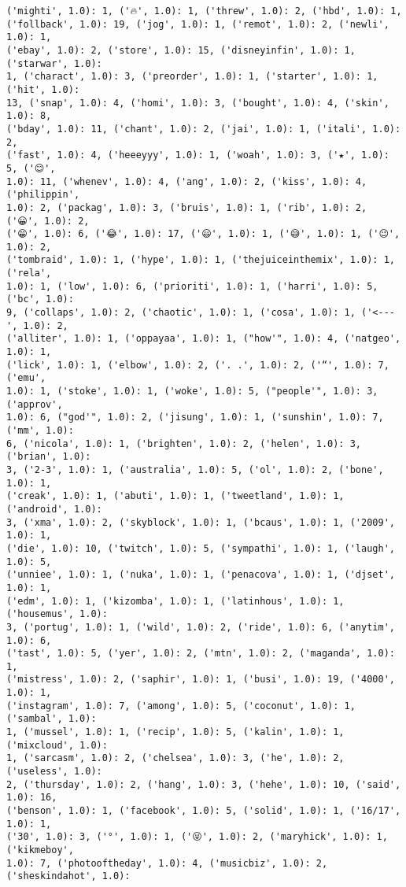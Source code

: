 \documentclass[11pt]{article}
\begin{document}
\begin{Verbatim}[commandchars=\\\{\}]
('mighti', 1.0): 1, ('🔥', 1.0): 1, ('threw', 1.0): 2, ('hbd', 1.0): 1,
('follback', 1.0): 19, ('jog', 1.0): 1, ('remot', 1.0): 2, ('newli', 1.0): 1,
('ebay', 1.0): 2, ('store', 1.0): 15, ('disneyinfin', 1.0): 1, ('starwar', 1.0):
1, ('charact', 1.0): 3, ('preorder', 1.0): 1, ('starter', 1.0): 1, ('hit', 1.0):
13, ('snap', 1.0): 4, ('homi', 1.0): 3, ('bought', 1.0): 4, ('skin', 1.0): 8,
('bday', 1.0): 11, ('chant', 1.0): 2, ('jai', 1.0): 1, ('itali', 1.0): 2,
('fast', 1.0): 4, ('heeeyyy', 1.0): 1, ('woah', 1.0): 3, ('★', 1.0): 5, ('😊',
1.0): 11, ('whenev', 1.0): 4, ('ang', 1.0): 2, ('kiss', 1.0): 4, ('philippin',
1.0): 2, ('packag', 1.0): 3, ('bruis', 1.0): 1, ('rib', 1.0): 2, ('😀', 1.0): 2,
('😁', 1.0): 6, ('😂', 1.0): 17, ('😃', 1.0): 1, ('😅', 1.0): 1, ('😉', 1.0): 2,
('tombraid', 1.0): 1, ('hype', 1.0): 1, ('thejuiceinthemix', 1.0): 1, ('rela',
1.0): 1, ('low', 1.0): 6, ('prioriti', 1.0): 1, ('harri', 1.0): 5, ('bc', 1.0):
9, ('collaps', 1.0): 2, ('chaotic', 1.0): 1, ('cosa', 1.0): 1, ('<---', 1.0): 2,
('alliter', 1.0): 1, ('oppayaa', 1.0): 1, ("how'", 1.0): 4, ('natgeo', 1.0): 1,
('lick', 1.0): 1, ('elbow', 1.0): 2, ('. .', 1.0): 2, ('“', 1.0): 7, ('emu',
1.0): 1, ('stoke', 1.0): 1, ('woke', 1.0): 5, ("people'", 1.0): 3, ('approv',
1.0): 6, ("god'", 1.0): 2, ('jisung', 1.0): 1, ('sunshin', 1.0): 7, ('mm', 1.0):
6, ('nicola', 1.0): 1, ('brighten', 1.0): 2, ('helen', 1.0): 3, ('brian', 1.0):
3, ('2-3', 1.0): 1, ('australia', 1.0): 5, ('ol', 1.0): 2, ('bone', 1.0): 1,
('creak', 1.0): 1, ('abuti', 1.0): 1, ('tweetland', 1.0): 1, ('android', 1.0):
3, ('xma', 1.0): 2, ('skyblock', 1.0): 1, ('bcaus', 1.0): 1, ('2009', 1.0): 1,
('die', 1.0): 10, ('twitch', 1.0): 5, ('sympathi', 1.0): 1, ('laugh', 1.0): 5,
('unniee', 1.0): 1, ('nuka', 1.0): 1, ('penacova', 1.0): 1, ('djset', 1.0): 1,
('edm', 1.0): 1, ('kizomba', 1.0): 1, ('latinhous', 1.0): 1, ('housemus', 1.0):
3, ('portug', 1.0): 1, ('wild', 1.0): 2, ('ride', 1.0): 6, ('anytim', 1.0): 6,
('tast', 1.0): 5, ('yer', 1.0): 2, ('mtn', 1.0): 2, ('maganda', 1.0): 1,
('mistress', 1.0): 2, ('saphir', 1.0): 1, ('busi', 1.0): 19, ('4000', 1.0): 1,
('instagram', 1.0): 7, ('among', 1.0): 5, ('coconut', 1.0): 1, ('sambal', 1.0):
1, ('mussel', 1.0): 1, ('recip', 1.0): 5, ('kalin', 1.0): 1, ('mixcloud', 1.0):
1, ('sarcasm', 1.0): 2, ('chelsea', 1.0): 3, ('he', 1.0): 2, ('useless', 1.0):
2, ('thursday', 1.0): 2, ('hang', 1.0): 3, ('hehe', 1.0): 10, ('said', 1.0): 16,
('benson', 1.0): 1, ('facebook', 1.0): 5, ('solid', 1.0): 1, ('16/17', 1.0): 1,
('30', 1.0): 3, ('°', 1.0): 1, ('😜', 1.0): 2, ('maryhick', 1.0): 1, ('kikmeboy',
1.0): 7, ('photooftheday', 1.0): 4, ('musicbiz', 1.0): 2, ('sheskindahot', 1.0):

\end{Verbatim}
\end{document}
